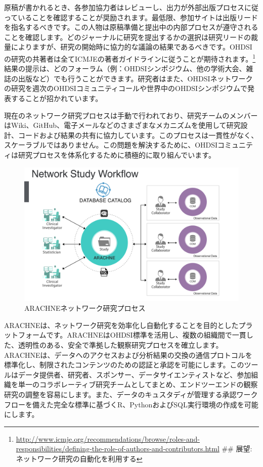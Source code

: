 \documentclass[
  11pt]{book}
\theoremstyle{definition}
\theoremstyle{definition}
\theoremstyle{definition}
\theoremstyle{definition}
\theoremstyle{remark}
\begin{document}
原稿が書かれるとき、各参加協力者はレビューし、出力が外部出版プロセスに従っていることを確認することが奨励されます。最低限、参加サイトは出版リードを指名するべきです。この人物は原稿準備と提出中の内部プロセスが遵守されることを確認します。どのジャーナルに研究を提出するかの選択は研究リードの裁量によりますが、研究の開始時に協力的な議論の結果であるべきです。OHDSIの研究の共著者は全てICMJEの著者ガイドラインに従うことが期待されます。\footnote{\url{http://www.icmje.org/recommendations/browse/roles-and-responsibilities/defining-the-role-of-authors-and-contributors.html}
  \#\# 展望: ネットワーク研究の自動化を利用する} 結果の提示は、どのフォーラム（例：OHDSIシンポジウム、他の学術大会、雑誌の出版など）でも行うことができます。研究者はまた、OHDSIネットワークの研究を週次のOHDSIコミュニティコールや世界中のOHDSIシンポジウムで発表することが招かれています。


現在のネットワーク研究プロセスは手動で行われており、研究チームのメンバーはWiki、GitHub、電子メールなどのさまざまなメカニズムを使用して研究設計、コードおよび結果の共有に協力しています。このプロセスは一貫性がなく、スケーラブルではありません。この問題を解決するために、OHDSIコミュニティは研究プロセスを体系化するために積極的に取り組んでいます。

\begin{figure}[h]

{\centering \includegraphics[width=0.9\linewidth]{images/NetworkStudies/ARACHNE} 

}

\caption{ARACHNEネットワーク研究プロセス}\label{fig:arachne}
\end{figure}

ARACHNEは、ネットワーク研究を効率化し自動化することを目的としたプラットフォームです。ARACHNEはOHDSI標準を活用し、複数の組織間で一貫した、透明性のある、安全で準拠した観察研究プロセスを確立します。ARACHNEは、データへのアクセスおよび分析結果の交換の通信プロトコルを標準化し、制限されたコンテンツのための認証と承認を可能にします。このツールはデータ提供者、研究者、スポンサー、データサイエンティストなど、参加組織を単一のコラボレーティブ研究チームとしてまとめ、エンドツーエンドの観察研究の調整を容易にします。また、データのキュスタディが管理する承認ワークフローを備えた完全な標準に基づくR、PythonおよびSQL実行環境の作成を可能にします。
\end{document}
